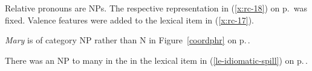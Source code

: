 Relative pronouns are NPs. The respective representation in (\ref{x:rc-18}) on p.\,\pageref{x:rc-18}
was fixed. Valence features were added to the lexical item in (\ref{x:rc-17}).

\emph{Mary} is of category NP rather than N in Figure~\ref{coordphr} on p.\,\pageref{coordphr}. 

There was an NP to many in the \compsl in the lexical item in (\ref{le-idiomatic-spill}) on
p.\,\pageref{le-idiomatic-spill}.










%
%
%

%
%
%
%
%
%
%
%
%
%

